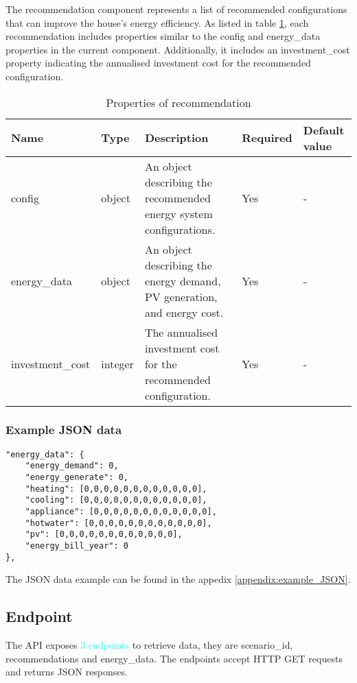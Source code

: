 The recommendation component represents a list of recommended configurations that can improve the house's energy efficiency. 
As listed in table \ref{tab:properties_recommendation}, each recommendation includes properties similar to the config and energy\_data properties in the current component. 
Additionally, it includes an investment\_cost property indicating the annualised investment cost for the recommended configuration. 

\begin{table}[h!]
    \centering
    \small
    \begin{tabular}{ | p{} | p{} | p{} | p{} | p{} | } 
    \hline
    Name & Type & Description & Required & Default value \\
    \hline
    config & object & An object describing the recommended energy system configurations. & Yes & - \\
    \hline
    energy\_data & object & An object describing the energy demand, PV generation, and energy cost. & Yes & - \\
    \hline
    investment\_cost & integer & The annualised investment cost for the recommended configuration. & Yes & - \\
    \hline
    \end{tabular}
    \caption{Properties of recommendation}
    \label{tab:properties_recommendation}
\end{table}


\subsubsection{Example JSON data}

\begin{verbatim}
"energy_data": {
    "energy_demand": 0,
    "energy_generate": 0,
    "heating": [0,0,0,0,0,0,0,0,0,0,0,0],
    "cooling": [0,0,0,0,0,0,0,0,0,0,0,0],
    "appliance": [0,0,0,0,0,0,0,0,0,0,0,0],
    "hotwater": [0,0,0,0,0,0,0,0,0,0,0,0],
    "pv": [0,0,0,0,0,0,0,0,0,0,0,0],
    "energy_bill_year": 0
},
\end{verbatim}

The JSON data example can be found in the appedix \ref{appendix:example_JSON}. 

\subsection{Endpoint}

The API exposes \textcolor{cyan}{3 endpoints} to retrieve data,
they are scenario\_id, recommendations and energy\_data.
The endpoints accept HTTP GET requests and returns JSON responses. 